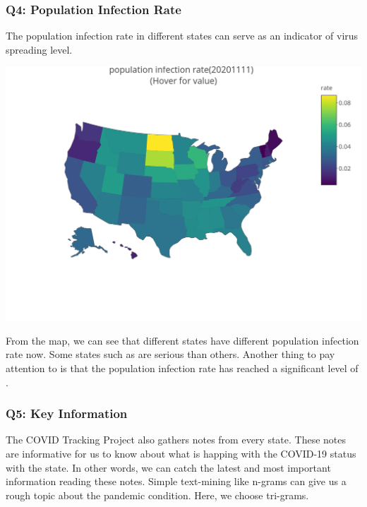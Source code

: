 \documentclass[
]{article}
\begin{document}
\hypertarget{q4-population-infection-rate}{%
\subsubsection{Q4: Population Infection
Rate}\label{q4-population-infection-rate}}

The population infection rate in different states can serve as an
indicator of virus spreading level.

\begin{center}\includegraphics[width=1\linewidth]{infection_rate} \end{center}

From the map, we can see that different states have different population
infection rate now. Some states such as are serious than others. Another
thing to pay attention to is that the population infection rate has
reached a significant level of .

\hypertarget{q5-key-information}{%
\subsubsection{Q5: Key Information}\label{q5-key-information}}

The COVID Tracking Project also gathers notes from every state. These
notes are informative for us to know about what is happing with the
COVID-19 status with the state. In other words, we can catch the latest
and most important information reading these notes. Simple text-mining
like n-grams can give us a rough topic about the pandemic condition.
Here, we choose tri-grams.
\end{document}
